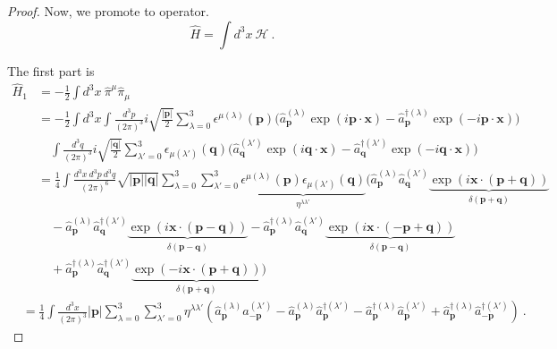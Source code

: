 \begin{proof}
        Now, we promote to operator. 
        \begin{equation*}
            \hat H = \int d^3 x ~ \mathcal H ~.
        \end{equation*}

        The first part is 
        \begin{equation*}
        \begin{aligned}
            \hat H_1 & = - \frac{1}{2} \int d^3 x ~ \hat \pi^\mu \hat \pi_\mu \\ & = - \frac{1}{2} \int d^3 x \int \frac{d^3 p}{(2\pi)^3} i \sqrt{\frac{|\mathbf p|}{2}} \sum_{\lambda=0}^{3} \epsilon^{\mu(\lambda)} (\mathbf p) \Big ( \hat a_{\mathbf p}^{(\lambda)}   \exp(i \mathbf p \cdot \mathbf x) - \hat a_{\mathbf p}^{\dagger (\lambda)}   \exp(- i \mathbf p \cdot \mathbf x) \Big) \\ & \quad \int \frac{d^3 q}{(2\pi)^3} i \sqrt{\frac{|\mathbf q|}{2}} \sum_{\lambda'=0}^{3} \epsilon_{\mu(\lambda')} (\mathbf q)  \Big ( \hat a_{\mathbf q}^{(\lambda')}   \exp(i \mathbf q \cdot \mathbf x) - \hat a_{\mathbf q}^{\dagger (\lambda')}   \exp(- i \mathbf q \cdot \mathbf x) \Big) \\ & = \frac{1}{4} \int \frac{d^3 x ~ d^3 p ~ d^3 q}{(2\pi)^6} \sqrt{|\mathbf p| |\mathbf q|} \sum_{\lambda=0}^{3} \sum_{\lambda'=0}^{3} \underbrace{\epsilon^{\mu(\lambda)} (\mathbf p) \epsilon_{\mu(\lambda')} (\mathbf q)}_{\eta^{\lambda \lambda'}} ( \hat a_{\mathbf p}^{(\lambda)}   \hat a_{\mathbf q}^{(\lambda')}   \underbrace{\exp(i  \mathbf x \cdot (\mathbf p + \mathbf q)) }_{\delta(\mathbf p + \mathbf q)}  \\ & \quad - \hat a_{\mathbf p}^{(\lambda)}  \hat a_{\mathbf q}^{\dagger (\lambda')}   \underbrace{\exp(i  \mathbf x \cdot (\mathbf p - \mathbf q)) }_{\delta(\mathbf p - \mathbf q)} - \hat a_{\mathbf p}^{\dagger (\lambda)}   \hat a_{\mathbf q}^{(\lambda')}   \underbrace{\exp(i  \mathbf x \cdot (- \mathbf p + \mathbf q)) }_{\delta(\mathbf p - \mathbf q)} \\ & \quad + \hat a_{\mathbf p}^{\dagger (\lambda)}   \hat a_{\mathbf q}^{\dagger (\lambda')}   \underbrace{\exp(- i  \mathbf x \cdot (\mathbf p + \mathbf q)) }_{\delta(\mathbf p + \mathbf q)} )
        \end{aligned}
        \end{equation*}
        \begin{equation*}
        \begin{aligned}
            & = \frac{1}{4} \int \frac{d^3 x}{(2\pi)^3} |\mathbf p| \sum_{\lambda=0}^{3} \sum_{\lambda'=0}^{3} \eta^{\lambda \lambda'} ( \hat a_{\mathbf p}^{(\lambda)} \hat a_{- \mathbf p}^{(\lambda')}  - \hat a_{\mathbf p}^{(\lambda)} \hat a_{\mathbf p}^{\dagger (\lambda')}  - \hat a_{\mathbf p}^{\dagger (\lambda)} \hat a_{\mathbf p}^{(\lambda')} + \hat a_{\mathbf p}^{\dagger (\lambda)} \hat a_{- \mathbf p}^{\dagger (\lambda')} ) ~.
        \end{aligned}
        \end{equation*}


\end{proof}
